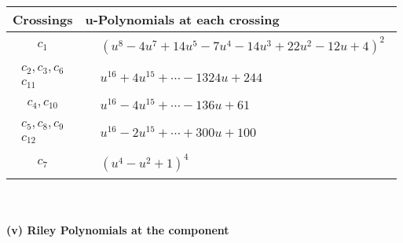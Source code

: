 \documentclass[1p]{elsarticle_modified}
\theoremstyle{definition}
\begin{document}
\begin{tabular}{m{50pt}|m{274pt}}
Crossings & \hspace{64pt}u-Polynomials at each crossing \\
\hline $$\begin{aligned}c_{1}\end{aligned}$$&$\begin{aligned}
&(u^8-4 u^7+14 u^5-7 u^4-14 u^3+22 u^2-12 u+4)^2
\end{aligned}$\\
\hline $$\begin{aligned}c_{2},c_{3},c_{6}\\c_{11}\end{aligned}$$&$\begin{aligned}
&u^{16}+4 u^{15}+\cdots-1324 u+244
\end{aligned}$\\
\hline $$\begin{aligned}c_{4},c_{10}\end{aligned}$$&$\begin{aligned}
&u^{16}-4 u^{15}+\cdots-136 u+61
\end{aligned}$\\
\hline $$\begin{aligned}c_{5},c_{8},c_{9}\\c_{12}\end{aligned}$$&$\begin{aligned}
&u^{16}-2 u^{15}+\cdots+300 u+100
\end{aligned}$\\
\hline $$\begin{aligned}c_{7}\end{aligned}$$&$\begin{aligned}
&(u^4- u^2+1)^4
\end{aligned}$\\
\hline
\end{tabular}\\~\\
\newpage\renewcommand{\arraystretch}{1}
\flushleft \textbf{(v) Riley Polynomials at the component}\newline \\
\end{document}
